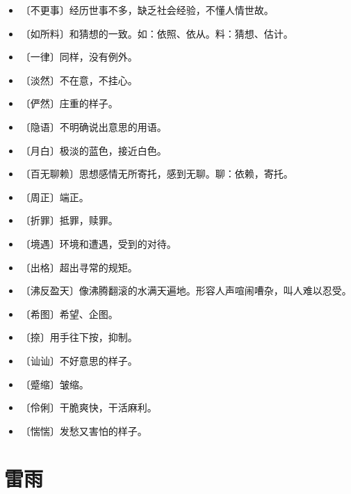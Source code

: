\documentclass[12pt,UTF-8,openany]{ctexbook}
\begin{document}
\begin{itemize}
    \setlength\itemsep{-0.2em}
    \item 〔不更事〕经历世事不多，缺乏社会经验，不懂人情世故。
    \item 〔如所料〕和猜想的一致。如：依照、依从。料：猜想、估计。
    \item 〔一律〕同样，没有例外。
    \item 〔淡然〕不在意，不挂心。
    \item 〔俨然〕庄重的样子。
    \item 〔隐语〕不明确说出意思的用语。
    \item 〔月白〕极淡的蓝色，接近白色。
    \item 〔百无聊赖〕思想感情无所寄托，感到无聊。聊：依赖，寄托。
    \item 〔周正〕端正。
    \item 〔折罪〕抵罪，赎罪。
    \item 〔境遇〕环境和遭遇，受到的对待。
    \item 〔出格〕超出寻常的规矩。
    \item 〔沸反盈天〕像沸腾翻滚的水满天遍地。形容人声喧闹嘈杂，叫人难以忍受。
    \item 〔希图〕希望、企图。
    \item 〔捺〕用手往下按，抑制。
    \item 〔讪讪〕不好意思的样子。
    \item 〔蹙缩〕皱缩。
    \item 〔伶俐〕干脆爽快，干活麻利。
    \item 〔惴惴〕发愁又害怕的样子。
\end{itemize}

\chapter{雷雨}
\end{document}
